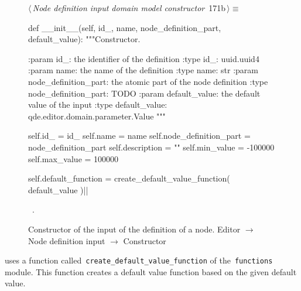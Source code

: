 \documentclass[%
    a4paper,    %
    justified,  %
    nobib,      %
    openany     %
]{tufte-book}
\makeatletter
\renewcommand{\label}[1]{\@tufte@label{##1}}%
\makeatother
\begin{document}
\begin{figure}[!htbp]
\begin{flushleft} \small
\begin{minipage}{\linewidth}\label{scrap141}\raggedright\small
{} $\langle\,${\itshape Node definition input domain model constructor}\nobreak\ {\footnotesize {171b}}$\,\rangle\equiv$
\vspace{-1ex}
\begin{pythoncode}
def __init__(self, id_, name, node_definition_part, default_value):
    """Constructor.

    :param id_: the identifier of the definition
    :type  id_: uuid.uuid4
    :param name: the name of the definition
    :type  name: str
    :param node_definition_part: the atomic part of the
                                 node definition
    :type node_definition_part: TODO
    :param default_value: the default value of the input
    :type default_value: qde.editor.domain.parameter.Value
    """

    self.id_                  = id_
    self.name                 = name
    self.node_definition_part = node_definition_part
    self.description          = ""
    self.min_value            = -100000
    self.max_value            = 100000

    self.default_function = create_default_value_function(
        default_value
    )|\NWsep|
\end{pythoncode}
\vspace{1.5ex}
\footnotesize
\begin{list}{}{\setlength{\itemsep}{-\parsep}\setlength{\itemindent}{-\leftmargin}}
\item \NWtxtMacroRefIn\ .

\item{}
\end{list}
\end{minipage}\vspace{4ex}
\end{flushleft}
\caption{Constructor of the input of the definition of a node.
  \newline{}\newline{}Editor $\rightarrow$ Node definition input $\rightarrow$
  Constructor}
\end{figure}

 uses a function called~\verb=create_default_value_function= of
the~\verb=functions= module. This function creates a default value function
based on the given default value.
\end{document}
